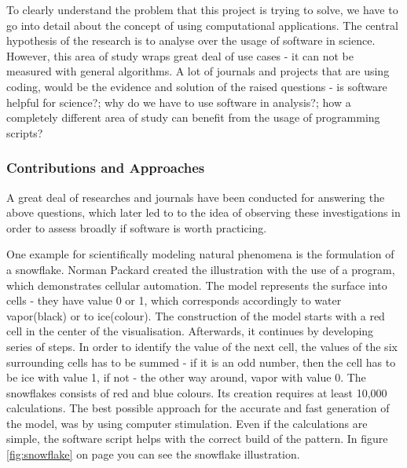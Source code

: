 
To clearly understand the problem that this project is trying to solve, we have to go into detail about the concept of using computational applications. The central hypothesis of the research is to analyse over the usage of software in science. However, this area of study wraps great deal of use cases - it can not be measured with general algorithms. A lot of journals and projects that are using coding, would be the evidence and solution of the raised questions - is software helpful for science?; why do we have to use software in analysis?; how a completely different area of study can benefit from the usage of programming scripts? 

\subsubsection{Contributions and Approaches}
\label{sec:contributions}

A great deal of researches and journals have been conducted for answering the above questions, which later led to to the idea of observing these investigations in order to assess broadly if software is worth practicing. 

One example for scientifically modeling natural phenomena is the formulation of a snowflake. Norman Packard created the illustration with the use of a program, which demonstrates cellular automation.\cite{wolfram1984computer}\cite{packard1986lattice} The model represents the surface into cells - they have value 0 or 1, which corresponds accordingly to water vapor(black) or to ice(colour). The construction of the model starts with a red cell in the center of the visualisation. Afterwards, it continues by developing series of steps. In order to identify the value of the next cell, the values of the six surrounding cells has to be summed - if it is an odd number, then the cell has to be ice with value 1, if not - the other way around, vapor with value 0. The snowflakes consists of red and blue colours. Its creation requires at least 10,000 calculations. The best possible approach for the accurate and fast generation of the model, was by using computer stimulation. Even if the calculations are simple, the software script helps with the correct build of the pattern.\cite{wolfram1984computer} In figure \ref{fig:snowflake} on page \pageref{fig:snowflake} you can see the snowflake illustration.

